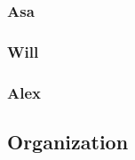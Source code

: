 \documentclass{article}
\begin{document}
\subsubsection{Asa}


\subsubsection{Will}


\subsubsection{Alex}


\subsection{Organization}


\nocite{*}

{}

\end{document}
